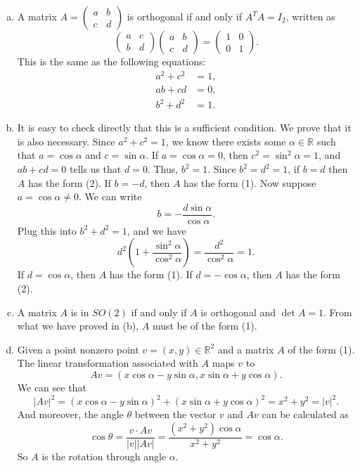 \documentclass[a4paper, 12pt]{article}
\begin{document}
\begin{solution}
\begin{enumerate}[(a)]
\item A matrix \(A=\begin{pmatrix}
    a&b\\ 
    c&d
\end{pmatrix}\) is orthogonal if and only if \(A^T A=I_2\), written as 
\[\begin{pmatrix}
    a&c\\ 
    b&d
\end{pmatrix}\begin{pmatrix}
    a&b\\ 
    c&d
\end{pmatrix}=\begin{pmatrix}
    1&0\\ 
    0&1
\end{pmatrix}.\]
This is the same as the following equations:
\begin{align*}
    a^2+c^2&=1,\\
    ab+cd&=0,\\ 
    b^2+d^2&=1. 
\end{align*}
\item It is easy to check directly that this is a sufficient condition. We prove that it is also necessary. Since \(a^2+c^2=1\), we know there exists some \(\alpha\in \mathbb{R}\) such that \(a=\cos \alpha\) and 
\(c=\sin \alpha\). If \(a=\cos \alpha=0\), then \(c^2=\sin^2 \alpha=1\), and \(ab+cd=0\) tells us that \(d=0\). Thus, \(b^2=1\). Since \(b^2=d^2=1\), if \(b=d\) then \(A\) has the form (2). If \(b=-d\), then \(A\) 
has the form (1). Now suppose \(a=\cos \alpha\neq 0\). We can write 
\[b=-\frac{d\sin \alpha}{\cos \alpha}.\]
Plug this into \(b^2+d^2=1\), and we have 
\[d^2(1+\frac{\sin^2 \alpha}{\cos^2 \alpha})=\frac{d^2}{\cos^2 \alpha}=1.\]
If \(d=\cos \alpha\), then \(A\) has the form (1). If \(d=-\cos \alpha\), then \(A\) has the form (2).
\item A matrix \(A\) is in \(SO(2)\) if and only if \(A\) is orthogonal and \(\det A=1\). From what we have proved in (b), \(A\) must be of the form (1). 
\item Given a point nonzero point \(v=(x,y)\in \mathbb{R}^2\) and a matrix \(A\) of the form (1). The linear transformation associated with \(A\) maps \(v\) to 
\[Av=(x\cos \alpha-y\sin \alpha,x\sin \alpha+y\cos \alpha).\]
We can see that 
\[|Av|^2=(x\cos \alpha-y\sin \alpha)^2+(x\sin \alpha+y\cos \alpha)^2=x^2+y^2=|v|^2.\]
And moreover, the angle \(\theta\) between the vector \(v\) and \(Av\) can be calculated as 
\[\cos \theta=\dfrac{v\cdot Av}{|v||Av|}=\dfrac{(x^2+y^2)\cos \alpha}{x^2+y^2}=\cos \alpha.\]
So \(A\) is the rotation through angle \(\alpha\). 


\end{enumerate}
\end{solution}
\end{document}

